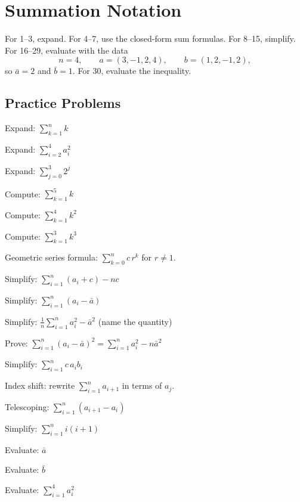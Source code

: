 \chapter{Summation Notation}

For 1--3, expand. For 4--7, use the closed-form sum formulas. For 8--15,
simplify. For 16--29, evaluate with the data
\[
  n=4,\qquad a=(3,-1,2,4),\qquad b=(1,2,-1,2),
\]
so $\bar a=2$ and $\bar b=1$. For 30, evaluate the inequality.

\section{Practice Problems}

\begin{problems}
  \item Expand: $\displaystyle\sum_{k=1}^{n}k$
  \item Expand: $\displaystyle\sum_{i=2}^{4}a_{i}^{2}$
  \item Expand: $\displaystyle\sum_{j=0}^{3}2^{j}$
  \item Compute: $\displaystyle\sum_{k=1}^{5}k$
  \item Compute: $\displaystyle\sum_{k=1}^{4}k^{2}$
  \item Compute: $\displaystyle\sum_{k=1}^{3}k^{3}$
  \item Geometric series formula: $\displaystyle\sum_{k=0}^{n}c\,r^{k}$ for
        $r\neq 1$.
  \item Simplify: $\displaystyle\sum_{i=1}^{n}(a_{i}+c)-nc$
  \item Simplify: $\displaystyle\sum_{i=1}^{n}(a_{i}-\bar a)$
  \item Simplify: $\displaystyle\frac{1}{n}\sum_{i=1}^{n}a_{i}^{2}-\bar
        a^{2}$ (name the quantity)
  \item Prove: $\displaystyle\sum_{i=1}^{n}(a_{i}-\bar a)^{2}
        =\sum_{i=1}^{n}a_{i}^{2}-n\bar a^{2}$
  \item Simplify: $\displaystyle\sum_{i=1}^{n}c\,a_{i}b_{i}$
  \item Index shift: rewrite $\displaystyle\sum_{i=1}^{n}a_{i+1}$ in terms
        of $a_{j}$.
  \item Telescoping: $\displaystyle\sum_{i=1}^{n}(a_{i+1}-a_{i})$
  \item Simplify: $\displaystyle\sum_{i=1}^{n}i(i+1)$
  \item Evaluate: $\bar a$
  \item Evaluate: $\bar b$
  \item Evaluate: $\displaystyle\sum_{i=1}^{4}a_{i}^{2}$

\end{problems}
